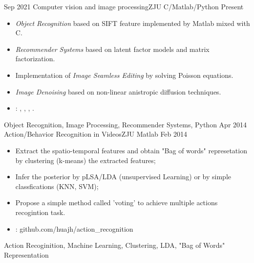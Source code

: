 %
%


 
\begin{experiences}
	
		
 \experience
    {Sep 2021}   {Computer vision and image processing}{ZJU }{C/Matlab/Python}
    {Present} {
                      \begin{itemize}
                        \item \emph{Object Recognition} based on SIFT feature implemented by Matlab mixed with C.
                        \item \emph{Recommender Systems} based on latent factor models and matrix factorization.                  
                        \item Implementation of \emph{{Image Seamless Editing}} by solving Poisson equations.
                        \item \emph{Image Denoising} based on non-linear anistropic diﬀusion techniques.
                        \item \faGithub: 
                        , 
                        ,
                        ,
                        .                                                                                       
                      \end{itemize}
                    }
                    {Object Recognition, Image Processing, Recommender Systems, Python}
  \emptySeparator
  \experience
    {Apr 2014} {Action/Behavior Recognition in Videos}{ZJU}{ Matlab}
    {Feb 2014}    {
                      \begin{itemize}
                        \item Extract the spatio-temporal features and obtain "Bag of words" represetation by clustering (k-means) the extracted features; 
                        \item Infer the posterior by pLSA/LDA (unsupervised Learning) or by simple classfications (KNN, SVM);                    
                        \item Propose a simple method called 'voting' to achieve multiple actions recogintion task.
                        \item \faGithub:  {github.com/huajh/action\_recognition}                                                                                          
                      \end{itemize}
                    }
                    {Action Recoginition, Machine Learning, Clustering, LDA, "Bag of Words" Representation}


\end{experiences}
